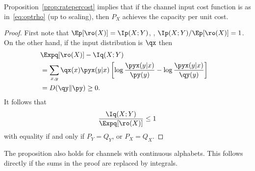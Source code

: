 Proposition~\ref{prop:ratepercost} implies that if the channel input cost
function is as in~\eqref{eq:optrho} (up to scaling), then $P_X$ achieves the
capacity per unit cost.

\begin{proof}
  First note that $\Ep[\ro(X)] = \Ip(X;Y)$, \ie, $\Ip(X;Y) / \Ep[\ro(X)] = 1$.
  On the other hand, if the input distribution is $\qx$ then
  \begin{align*}
    \lefteqn{\Expq[\ro(X)] - \Iq(X;Y)} \\
    &= \sum_{x,y} \qx(x) \pyx(y|x) \left[ \log \frac{\pyx(y|x)}{\py(y)} -
    \log \frac{\pyx(y|x)}{\qy(y)} \right] \\
    &= D(\qy \| \py) \ge 0.
  \end{align*}
  It follows that
  \[ \frac{\Iq(X;Y)}{\Expq [\ro(X)]} \le 1
  \]
  with equality if and only if $P_Y = Q_Y$, or $P_X = Q_X$.
\end{proof}

\begin{remark}
  \label{rem:continuouscuc}
  The proposition also holds for channels with continuous alphabets. This
  follows directly if the sums in the proof are replaced by integrals.
\end{remark}

